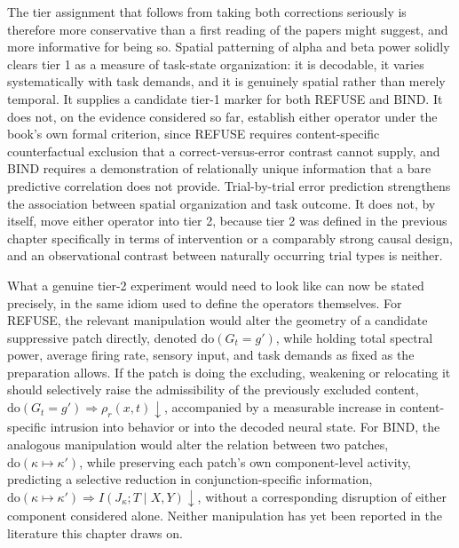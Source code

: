 \documentclass[11pt]{book}
\begin{document}
The tier assignment that follows from taking both corrections seriously is therefore more conservative than a first reading of the papers might suggest, and more informative for being so. Spatial patterning of alpha and beta power solidly clears tier 1 as a measure of task-state organization: it is decodable, it varies systematically with task demands, and it is genuinely spatial rather than merely temporal. It supplies a candidate tier-1 marker for both REFUSE and BIND. It does not, on the evidence considered so far, establish either operator under the book's own formal criterion, since REFUSE requires content-specific counterfactual exclusion that a correct-versus-error contrast cannot supply, and BIND requires a demonstration of relationally unique information that a bare predictive correlation does not provide. Trial-by-trial error prediction strengthens the association between spatial organization and task outcome. It does not, by itself, move either operator into tier 2, because tier 2 was defined in the previous chapter specifically in terms of intervention or a comparably strong causal design, and an observational contrast between naturally occurring trial types is neither.

What a genuine tier-2 experiment would need to look like can now be stated precisely, in the same idiom used to define the operators themselves. For REFUSE, the relevant manipulation would alter the geometry of a candidate suppressive patch directly, denoted $\mathrm{do}(G_t = g')$, while holding total spectral power, average firing rate, sensory input, and task demands as fixed as the preparation allows. If the patch is doing the excluding, weakening or relocating it should selectively raise the admissibility of the previously excluded content, $\mathrm{do}(G_t = g') \Rightarrow \rho_r(x,t) \downarrow$, accompanied by a measurable increase in content-specific intrusion into behavior or into the decoded neural state. For BIND, the analogous manipulation would alter the relation between two patches, $\mathrm{do}(\kappa \mapsto \kappa')$, while preserving each patch's own component-level activity, predicting a selective reduction in conjunction-specific information, $\mathrm{do}(\kappa \mapsto \kappa') \Rightarrow I(J_\kappa; T \mid X, Y) \downarrow$, without a corresponding disruption of either component considered alone. Neither manipulation has yet been reported in the literature this chapter draws on.
\end{document}
